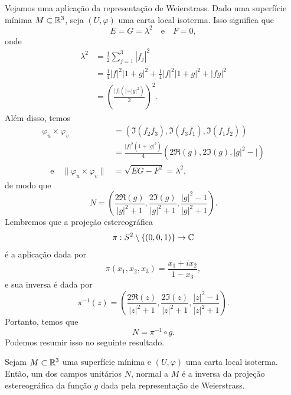\begin{exemplo}
	Vejamos uma aplicação da representação de Weierstrass. Dado uma superfície mínima $M \subset \mathbb{R}^3$, seja $(U, \varphi)$ uma carta local isoterma.
	Isso significa que
	\begin{equation*}
	E = G = \lambda^2 \quad \text{e} \quad
	F = 0,
	\end{equation*}
	onde
	\begin{align*}
	\lambda^2 &= \frac{1}{2} \sum_{j=1}^{3} |f_j|^2 \\
	&= \frac{1}{4} |f|^2 |1 + g|^2 + \frac{1}{4} |f|^2 |1 + g|^2 + |fg|^2\\
	&= \left( \frac{|f| (| + |g|^2)}{2} \right)^2.
	\end{align*} 
	Além disso, temos
	\begin{align*}
	\varphi_u \times \varphi_v &= \left( \Im (f_2 \overline{f}_3), \Im (f_3 \overline{f}_1), \Im (f_1 \overline{f}_2) \right) \\
	&= \frac{|f|^2 (1 + |g|^2)}{4} \left( 2 \Re(g), 2 \Im(g), |g|^2 - | \right)\\
	\quad \text{e} \quad \| \varphi_u \times \varphi_v \| &= \sqrt{EG - F^2} = \lambda^2,
	\end{align*}
	de modo que
	\begin{equation*}
	N = \left( \frac{2 \Re(g)}{|g|^2 + 1}, \frac{2 \Im(g)}{|g|^2 + 1}, \frac{|g|^2 - 1}{|g|^2 + 1} \right).
	\end{equation*}
	Lembremos que a projeção estereográfica
	\begin{equation*}
	\pi: S^2 \setminus \{ (0,0,1) \} \rightarrow \mathbb{C}
	\end{equation*}
	é a aplicação dada por
	\begin{equation*}
	\pi(x_1, x_2, x_3) = \frac{x_1 + ix_2}{1 - x_3},
	\end{equation*}
	e sua inversa é dada por
	\begin{equation*}
	\pi^{-1}(z) = \left( \frac{2 \Re(z)}{|z|^2 + 1}, \frac{2 \Im(z)}{|z|^2 + 1}, \frac{|z|^2 - 1}{|z|^2 + 1} \right).
	\end{equation*}
	Portanto, temos que
	\begin{equation}\label{eq:projecao-esterografica}
	N = \pi^{-1} \circ g.
	\end{equation}
	Podemos resumir isso no seguinte resultado.
\end{exemplo}

\begin{proposicao}
	Sejam $M \subset \mathbb{R}^3$ uma superfície mínima e $(U, \varphi)$ uma carta local isoterma. Então, um dos campos unitários $N$, normal a $M$ é a inversa da projeção estereográfica da função $g$ dada pela representação de Weierstrass.
\end{proposicao}

